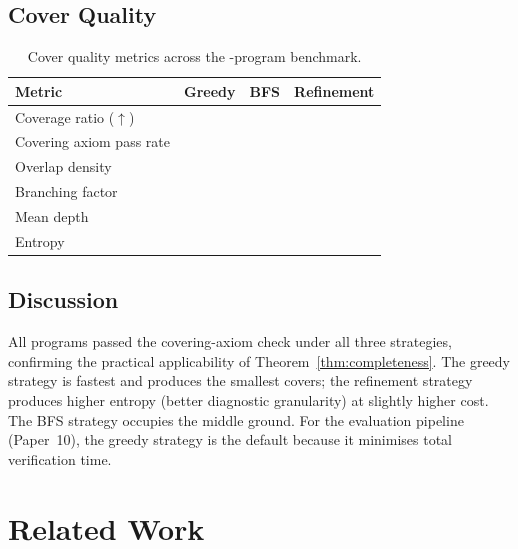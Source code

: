 \documentclass[11pt]{article}
\begin{document}
\subsection{Cover Quality}

\begin{table}[h]
\centering
\caption{Cover quality metrics across the \expTotalPrograms-program benchmark.}
\label{tab:quality}
\begin{tabular}{lrrr}
\toprule
\textbf{Metric} & \textbf{Greedy} & \textbf{BFS} & \textbf{Refinement} \\
\midrule
Coverage ratio ($\uparrow$)     & \ppElevenMeanCovRatio{} & \ppElevenMeanCovRatio{} & \ppElevenMeanCovRatio{} \\
Covering axiom pass rate        & \ppElevenAllAxiomsPass{} & \ppElevenAllAxiomsPass{} & \ppElevenAllAxiomsPass{} \\
Overlap density                 & \ppElevenMeanOverlap{} & \ppElevenMeanOverlap{} & \ppElevenMeanOverlap{} \\
Branching factor               & \ppElevenMeanBranchFactor{} & \ppElevenMeanBranchFactor{} & \ppElevenMeanBranchFactor{} \\
Mean depth                     & \ppElevenMeanDepth{} & \ppElevenMeanDepth{} & \ppElevenMeanDepth{} \\
Entropy                        & \ppElevenMeanEntropy{} & \ppElevenMeanEntropy{} & \ppElevenMeanEntropy{} \\
\bottomrule
\end{tabular}
\end{table}

\subsection{Discussion}

All \expTotalPrograms{} programs passed the covering-axiom check under all three
strategies, confirming the practical applicability of
Theorem~\ref{thm:completeness}.
The greedy strategy is fastest and produces the smallest covers;
the refinement strategy produces higher entropy (better diagnostic
granularity) at slightly higher cost.
The BFS strategy occupies the middle ground.
For the \JuGeo{} evaluation pipeline (Paper~10), the greedy strategy
is the default because it minimises total verification time.

\section{Related Work}\label{sec:related}
\end{document}

